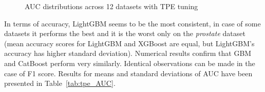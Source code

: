 \documentclass[magisterska, english]{pwr_wmat_praca_dyplomowa}
\theoremstyle{plain}
\numberwithin{theorem}{chapter}
\theoremstyle{definition}
\numberwithin{theorem}{chapter}
\begin{document}
\begin{figure}[H]
	\centering
	\caption{AUC distributions across 12 datasets with TPE tuning}
	\label{fig:tpe_AUC}
\end{figure}

In terms of accuracy, LightGBM seems to be the most consistent, in case of some datasets it performs the best and it is the worst only on the \emph{prostate} dataset (mean accuracy scores for LightGBM and XGBoost are equal, but LightGBM's accuracy has higher standard deviation). Numerical results confirm that GBM and CatBoost perform very similarly. Identical observations can be made in the case of F1 score.
Results for means and standard deviations of AUC have been presented in Table~\ref{tab:tpe_AUC}.
\end{document}
